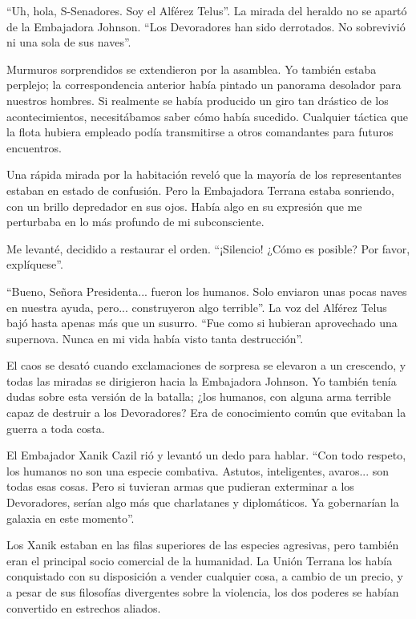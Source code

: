 \documentclass[spanish,12pt,a4paper,oneside,titlepage]{book}
\begin{document}
    ``Uh, hola, S-Senadores. Soy el Alférez Telus''. La mirada del heraldo no se apartó de la Embajadora Johnson. ``Los Devoradores han sido derrotados. No sobrevivió ni una sola de sus naves''.

    Murmuros sorprendidos se extendieron por la asamblea. Yo también estaba perplejo; la correspondencia anterior había pintado un panorama desolador para nuestros hombres. Si realmente se había producido un giro tan drástico de los acontecimientos, necesitábamos saber cómo había sucedido. Cualquier táctica que la flota hubiera empleado podía transmitirse a otros comandantes para futuros encuentros.

    Una rápida mirada por la habitación reveló que la mayoría de los representantes estaban en estado de confusión. Pero la Embajadora Terrana estaba sonriendo, con un brillo depredador en sus ojos. Había algo en su expresión que me perturbaba en lo más profundo de mi subconsciente.

    Me levanté, decidido a restaurar el orden. ``¡Silencio! ¿Cómo es posible? Por favor, explíquese''.

    ``Bueno, Señora Presidenta... fueron los humanos. Solo enviaron unas pocas naves en nuestra ayuda, pero... construyeron algo terrible''. La voz del Alférez Telus bajó hasta apenas más que un susurro. ``Fue como si hubieran aprovechado una supernova. Nunca en mi vida había visto tanta destrucción''.

    El caos se desató cuando exclamaciones de sorpresa se elevaron a un crescendo, y todas las miradas se dirigieron hacia la Embajadora Johnson. Yo también tenía dudas sobre esta versión de la batalla; ¿los humanos, con alguna arma terrible capaz de destruir a los Devoradores? Era de conocimiento común que evitaban la guerra a toda costa.

    El Embajador Xanik Cazil rió y levantó un dedo para hablar. ``Con todo respeto, los humanos no son una especie combativa. Astutos, inteligentes, avaros... son todas esas cosas. Pero si tuvieran armas que pudieran exterminar a los Devoradores, serían algo más que charlatanes y diplomáticos. Ya gobernarían la galaxia en este momento''.

    Los Xanik estaban en las filas superiores de las especies agresivas, pero también eran el principal socio comercial de la humanidad. La Unión Terrana los había conquistado con su disposición a vender cualquier cosa, a cambio de un precio, y a pesar de sus filosofías divergentes sobre la violencia, los dos poderes se habían convertido en estrechos aliados.
\end{document}
